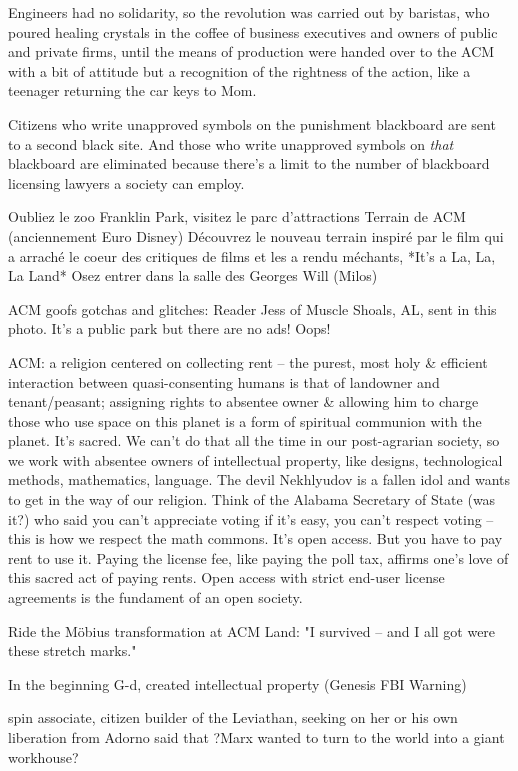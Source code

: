 Engineers had no solidarity, so the revolution was carried out by baristas, who poured healing crystals in the coffee of business executives and owners of public and private firms, until the means of production were handed over to the ACM with a bit of attitude but a recognition of the rightness of the action, like a teenager returning the car keys to Mom.

Citizens who write unapproved symbols on the punishment blackboard are sent to a second black site. And those who write unapproved symbols on \emph{that} blackboard are eliminated because there's a limit to the number of blackboard licensing lawyers a society can employ.

Oubliez le zoo Franklin Park, visitez le parc d'attractions Terrain de ACM (anciennement Euro Disney)
Découvrez le nouveau terrain inspiré par le film qui a arraché le coeur des critiques de films et les a rendu méchants, *It's a La, La, La Land*
Osez entrer dans la salle des Georges Will (Milos) 

ACM goofs gotchas and glitches:
Reader Jess of Muscle Shoals, AL, sent in this photo. It's a public park but there are no ads! Oops!

ACM: a religion centered on collecting rent -- the purest, most holy & efficient interaction between quasi-consenting humans is that of landowner and tenant/peasant; assigning rights to absentee owner & allowing him to charge those who use space on this planet is a form of spiritual communion with the planet. It's sacred. We can't do that all the time in our post-agrarian society, so we work with absentee owners of intellectual property, like designs, technological methods, mathematics, language. The devil Nekhlyudov is a fallen idol and wants to get in the way of our religion. Think of the Alabama Secretary of State (was it?) who said you can't appreciate voting if it's easy, you can't respect voting -- this is how we respect the math commons. It's open access. But you have to pay rent to use it. Paying the license fee, like paying the poll tax, affirms one's love of this sacred act of paying rents. Open access with strict end-user license agreements is the fundament of an open society.

Ride the Möbius transformation at ACM Land: "I survived -- and I all got were these stretch marks."

In the beginning G-d, created intellectual property (Genesis FBI Warning) 

spin associate, citizen builder of the Leviathan, seeking on her or his own liberation from
Adorno said that ?Marx wanted to turn to the world into a giant workhouse?

